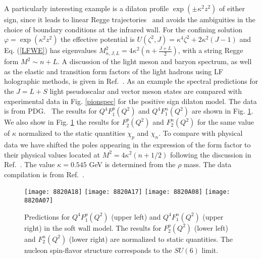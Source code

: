 \documentclass[prd,aps,onecolumn,nofootinbib]{revtex4}
\begin{document}
A particularly interesting example is a dilaton profile $\exp{\left(\pm \kappa^2 z^2\right)}$ of either sign, since it 
leads to linear Regge trajectories~\cite{Karch:2006pv} and avoids the ambiguities in the choice of boundary conditions at the infrared wall.  
For the  confining solution $\varphi = \exp{\left(\kappa^2 z^2\right)}$ the effective potential is
$U(\zeta^2,J) =   \kappa^4 \zeta^2 + 2 \kappa^2(J - 1)$ and  Eq.  (\ref{LFWE}) has eigenvalues
$M_{n, J, L}^2 = 4 \kappa^2 \left(n + \frac{J+L}{2} \right)$,
with a string Regge form $M^2 \sim n + L$.  
A discussion of the light meson and baryon spectrum,  as well as  the elastic and transition form factors of the light hadrons using LF holographic methods, is given in 
Ref.~\cite{deTeramond:2012rt}.  As an example the spectral predictions  for the $J = L + S$ light pseudoscalar and vector meson  states are  compared with experimental data in Fig. \ref{pionspec} for the positive sign dilaton model.  The data is from PDG.~\cite{PDG2012}   The results for $Q^4 F_1^p(Q^2)$ and $Q^4 F_1^n(Q^2)$  are shown in Fig. \ref{fig:nucleonFF}.  We also show in  Fig. \ref{fig:nucleonFF}
the results for $F_2^p(Q^2)$ and $F_2^n(Q^2)$ for the same value of $\kappa$ normalized  to the static quantities $\chi_p$ and $\chi_n$.
To compare with physical data we have shifted the poles appearing in the expression of the form factor to their physical values located at $M^2 = 4 \kappa^2(n + 1/2)$ 
following the  discussion in Ref.~\cite{deTeramond:2012rt}.
The value $\kappa = 0.545$ GeV  is determined from the $\rho$ mass.  The data compilation  is from Ref.~\cite{Diehl:2005wq}.

\begin{figure}[h]
\begin{center}
 \texttt{[image: 8820A18]}   \hspace{0pt}
\texttt{[image: 8820A17]}
 \texttt{[image: 8820A08]}   \hspace{0pt}
\texttt{[image: 8820A07]}
 \caption{Predictions for  $Q^4 F_1^p(Q^2)$ (upper left) and   $Q^4 F_1^n(Q^2)$ (upper right) in the
soft wall model. The results for  $F_2^p(Q^2)$ (lower left)  and  $F_2^n(Q^2)$ (lower right) are normalized to static quantities. 
The nucleon spin-flavor structure corresponds to the $SU(6)$ limit.}
\label{fig:nucleonFF}
\end{center}
\end{figure}
\end{document}
